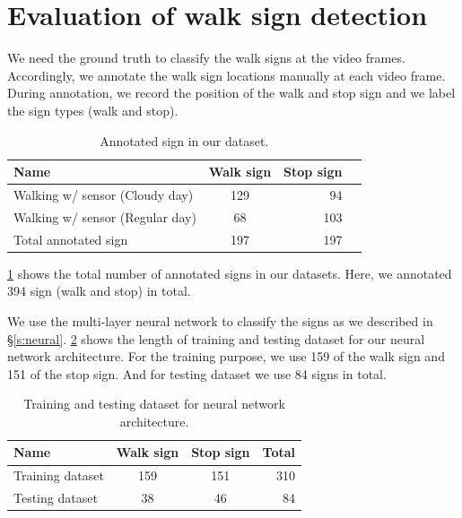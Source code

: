 \section{Evaluation of walk sign detection}
We need the ground truth to classify the walk signs at the video frames.
Accordingly, we annotate the walk sign locations manually at each video frame.
During annotation, we record the position of the walk and stop sign and we label the sign types (walk and stop). 

\begin{table}[ht!]
  \centering
  \caption{Annotated sign in our dataset.}
  \label{t:walk_sign_ann}
  \begin{tabular}{  l  c  r r }
    \rowcolor{gray!50}
    Name & Walk sign  & Stop sign \\
    \hline
    Walking w/ sensor (Cloudy day) & 129 & 94 \\ %
    Walking w/ sensor (Regular day) & 68 & 103  \\%
    Total annotated sign & 197 & 197 \\
    \hline
  \end{tabular}
\end{table}

\ref{t:walk_sign_ann} shows the total number of annotated signs in our datasets.
Here, we annotated 394 sign (walk and stop) in total.

We use the multi-layer neural network to classify the signs as we described in \S\ref{s:neural}.
\ref{t:training_neural} shows the length of training and testing dataset for our neural network architecture.
For the training purpose, we use 159 of the walk sign and 151 of the stop sign.
And for testing dataset we use 84 signs in total.

\begin{table}[ht!]
  \centering
  \caption{Training and testing dataset for neural network architecture.}
  \label{t:training_neural}
  \begin{tabular}{  l  c  c  r}
    \rowcolor{gray!50}
    Name & Walk sign & Stop sign & Total \\
    \hline
    Training dataset & 159 & 151 & 310\\ %
    Testing dataset & 38 & 46 & 84 \\%
   
    \hline
  \end{tabular}
\end{table}

